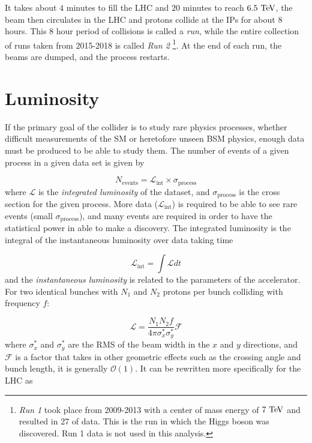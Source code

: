 It takes about $4$ minutes to fill the \ac{LHC} and $20$ minutes to reach $6.5 \TeV$, the beam then circulates in the \ac{LHC} and protons collide at the \ac{IP}s for about $8$ hours. This $8$ hour period of collisions is called a \emph{run}, while the entire collection of runs taken from 2015-2018 is called \emph{Run 2} \footnote{\emph{Run 1} took place from 2009-2013 with a center of mass energy of $7 \TeV$ and resulted in 27 \ifb of data. This is the run in which the Higgs boson was discovered. Run 1 data is not used in this analysis.}. At the end of each run, the beams are dumped, and the process restarts. 

\section{Luminosity}
\label{sec:lumi}

If the primary goal of the collider is to study rare physics processes, whether difficult measurements of the \ac{SM} or heretofore unseen \ac{BSM} physics, enough data must be produced to be able to study them. The number of events of a given process in a given data set is given by

\begin{equation}
N_{\textrm{events}} = \mathcal{L}_{\textrm{int}} \times \sigma_{\textrm{process}}
\label{eq:nevents_lumi}
\end{equation}
where $\mathcal{L}$ is the \emph{integrated luminosity} of the dataset, and $\sigma_{\textrm{process}}$ is the cross section for the given process. More data ($\mathcal{L}_{\textrm{int}}$) is required to be able to see rare events (small $\sigma_{\textrm{process}}$), and many events are required in order to have the statistical power in able to make a discovery. The integrated luminosity is the integral of the instantaneous luminosity over data taking time

\begin{equation}
\mathcal{L}_{\textrm{int}} = \int \mathcal{L} dt
\end{equation}
and the \emph{instantaneous luminosity} is related to the parameters of the accelerator. For two identical bunches with $N_1$ and $N_2$ protons per bunch colliding with frequency $f$:

\begin{equation}
\mathcal{L} = \frac{N_1 N_2 f}{4\pi \sigma_x^* \sigma_y^*} \mathcal{F}
\end{equation}
where $\sigma_x^*$ and  $\sigma_y^*$ are the \ac{RMS} of the beam width in the $x$ and $y$ directions, and $\mathcal{F}$ is a factor that takes in other geometric effects such as the crossing angle and bunch length, it is generally $\mathcal{O}(1)$. It can be rewritten more specifically for the \ac{LHC} as

